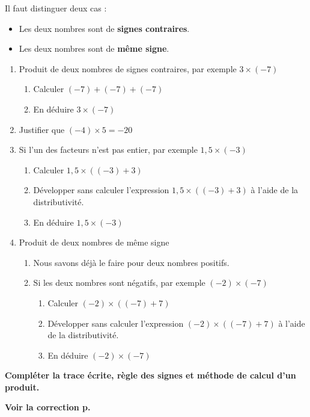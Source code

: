  \label{N1activite003}
\begin{activite}           
    Il faut distinguer deux cas :
    \begin{itemize}
        \item Les deux nombres sont de \textbf{signes contraires}.
        \item Les deux nombres sont de \textbf{même signe}.
    \end{itemize}

    \begin{enumerate}
        \item Produit de deux nombres de signes contraires, par exemple $3\times(-7)$
        \begin{enumerate}
            \item Calculer $(-7)+(-7)+(-7)$
            \item En déduire $3\times (-7)$
        \end{enumerate}
        \item Justifier que $(-4)\times 5=-20$
        \item Si l'un des facteurs n'est pas entier, par exemple $1,5\times (-3)$
        \begin{enumerate}
            \item Calculer $1,5\times ((-3)+3)$
            \item Développer sans calculer l'expression $1,5\times ((-3)+3)$ à l'aide de la distributivité.
            \item En déduire $1,5\times (-3)$
        \end{enumerate}
        \item Produit de deux nombres de même signe
        \begin{enumerate}
            \item Nous savons déjà le faire pour deux nombres positifs.
            \item Si les deux nombres sont négatifs, par exemple $(-2)\times (-7)$
            \begin{enumerate}
                \item Calculer $(-2)\times ((-7)+7)$
                \item Développer sans calculer l'expression $(-2)\times ((-7)+7)$ à l'aide de la distributivité.
                \item En déduire $(-2)\times (-7)$
            \end{enumerate}
        \end{enumerate}
    \end{enumerate}

    \textbf{Compléter la trace écrite, règle des signes et méthode de calcul d'un produit.}

    \textbf{Voir la correction p. \hyperref[corrN1activite003]{\pageref{corrN1activite003}}}

\end{activite}
